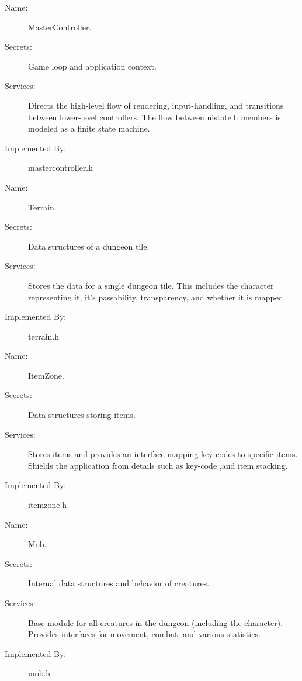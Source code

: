 \documentclass[12pt, titlepage]{article}
\begin{document}
        \bigskip\begin{description}
            \item[Name:]MasterController.
            \item[Secrets:]Game loop and application context.
            \item[Services:]Directs the high-level flow of rendering, input-handling, and transitions between lower-level controllers. The flow between uistate.h members is modeled as a finite state machine.
            \item[Implemented By:]mastercontroller.h
        \end{description}

        \bigskip\begin{description}
            \item[Name:]Terrain.
            \item[Secrets:]Data structures of a dungeon tile.
            \item[Services:]Stores the data for a single dungeon tile. This includes the character representing it, it's passability, transparency, and whether it is mapped.
            \item[Implemented By:]terrain.h
        \end{description}

        \bigskip\begin{description}
            \item[Name:]ItemZone.
            \item[Secrets:]Data structures storing items.
            \item[Services:]Stores items and provides an interface mapping key-codes to specific items. Shields the application from details such as key-code ,and item stacking. 
            \item[Implemented By:]itemzone.h
        \end{description}

        \bigskip\begin{description}
            \item[Name:]Mob.
            \item[Secrets:]Internal data structures and behavior of creatures.
            \item[Services:]Base module for all creatures in the dungeon (including the character). Provides interfaces for movement, combat, and various statistics.
            \item[Implemented By:]mob.h
        \end{description}
\end{document}
